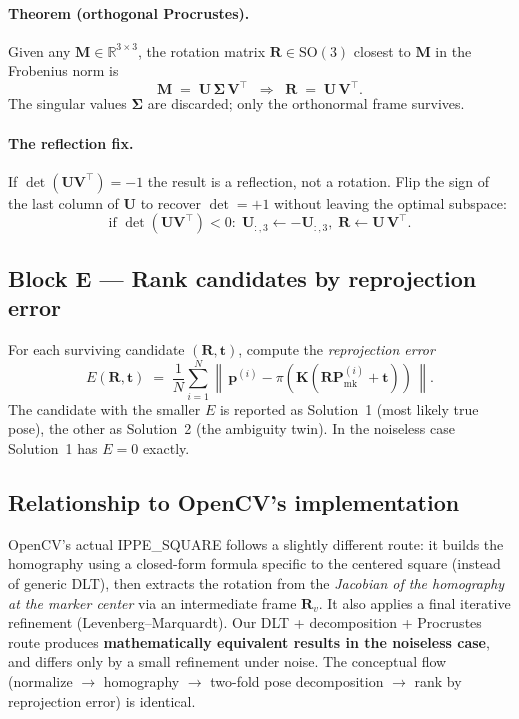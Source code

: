 \documentclass[11pt]{article}
\newcommand{\R}{\mathbb{R}}
\newcommand{\SO}[1]{\mathrm{SO}(#1)}
\newcommand{\norm}[1]{\left\lVert #1 \right\rVert}
\newcommand{\Pmark}{\mathbf{P}_{\text{mk}}}
\newcommand{\KK}{\mathbf{K}}
\begin{document}
\paragraph{Theorem (orthogonal Procrustes).}
Given any $\mathbf{M} \in \R^{3 \times 3}$, the rotation matrix
$\mathbf{R} \in \SO{3}$ closest to $\mathbf{M}$ in the Frobenius norm is
\begin{equation}
  \mathbf{M} \;=\; \mathbf{U}\,\boldsymbol{\Sigma}\,\mathbf{V}^\top
  \;\;\Longrightarrow\;\;
  \mathbf{R} \;=\; \mathbf{U}\,\mathbf{V}^\top.
\end{equation}
The singular values $\boldsymbol{\Sigma}$ are discarded; only the orthonormal
frame survives.

\paragraph{The reflection fix.}
If $\det(\mathbf{U}\mathbf{V}^\top) = -1$ the result is a reflection, not a
rotation. Flip the sign of the last column of $\mathbf{U}$ to recover
$\det = +1$ without leaving the optimal subspace:
\begin{equation}
  \text{if } \det(\mathbf{U}\mathbf{V}^\top) < 0: \;
  \mathbf{U}_{:,3} \leftarrow -\mathbf{U}_{:,3}, \;
  \mathbf{R} \leftarrow \mathbf{U}\,\mathbf{V}^\top.
\end{equation}

\subsection{Block E --- Rank candidates by reprojection error}

For each surviving candidate $(\mathbf{R}, \mathbf{t})$, compute the
\emph{reprojection error}
\begin{equation}
  E(\mathbf{R}, \mathbf{t})
  \;=\; \frac{1}{N}\sum_{i=1}^{N} \norm{\,\mathbf{p}^{(i)} - \pi(\KK(\mathbf{R}\Pmark^{(i)} + \mathbf{t}))\,}.
\end{equation}
The candidate with the smaller $E$ is reported as Solution~1 (most likely
true pose), the other as Solution~2 (the ambiguity twin). In the
noiseless case Solution~1 has $E = 0$ exactly.

\subsection{Relationship to OpenCV's implementation}

OpenCV's actual IPPE\_SQUARE follows a slightly different route:
it builds the homography using a closed-form formula specific to the
centered square (instead of generic DLT), then extracts the rotation from
the \emph{Jacobian of the homography at the marker center} via an
intermediate frame $\mathbf{R}_v$. It also applies a final iterative
refinement (Levenberg--Marquardt). Our DLT + decomposition + Procrustes
route produces \textbf{mathematically equivalent results in the noiseless
case}, and differs only by a small refinement under noise. The conceptual
flow (normalize $\to$ homography $\to$ two-fold pose decomposition $\to$
rank by reprojection error) is identical.
\end{document}
